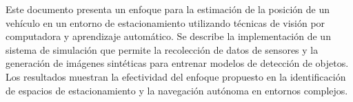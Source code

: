 
Este documento presenta un enfoque para la estimación de la posición de un vehículo en un entorno de estacionamiento
utilizando técnicas de visión por computadora y aprendizaje automático. Se describe la implementación de un sistema
de simulación que permite la recolección de datos de sensores y la generación de imágenes sintéticas para entrenar 
modelos de detección de objetos. Los resultados muestran la efectividad del enfoque propuesto en la identificación de 
espacios de estacionamiento y la navegación autónoma en entornos complejos.
